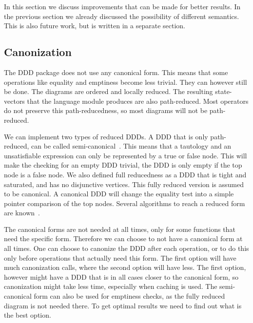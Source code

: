 In this section we discuss improvements that can be made for better results. In the previous section we already discussed the possibility of different semantics. This is also future work, but is written in a separate section.

\subsection{Canonization}
The DDD package does not use any canonical form. This means that some operations like equality and emptiness become less trivial. They can however still be done. The diagrams are ordered and locally reduced. The resulting state-vectors that the language module produces are also path-reduced. Most operators do not preserve this path-reducedness, so most diagrams will not be path-reduced. 

We can implement two types of reduced DDDs. A DDD that is only path-reduced, can be called semi-canonical~\cite{ddds}. This means that a tautology and an unsatisfiable expression can only be represented by a true or false node. This will make the checking for an empty DDD trivial, the DDD is only empty if the top node is a false node. We also defined full reducedness as a DDD that is tight and saturated, and has no disjunctive vertices. This fully reduced version is assumed to be canonical. A canonical DDD will change the equality test into a simple pointer comparison of the top nodes.
Several algorithms to reach a reduced form are known~\cite{ddd-mt-98}.

The canonical forms are not needed at all times, only for some functions that need the specific form. Therefore we can choose to not have a canonical form at all times. One can choose to canonize the DDD after each operation, or to do this only before operations that actually need this form. The first option will have much canonization calls, where the second option will have less. The first option, however might have a DDD that is in all cases closer to the canonical form, so canonization might take less time, especially when caching is used. The semi-canonical form can also be used for emptiness checks, as the fully reduced diagram is not needed there. To get optimal results we need to find out what is the best option.

